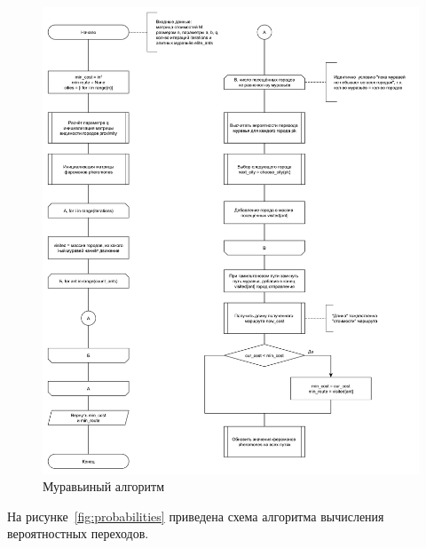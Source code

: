 \begin{figure}
	\centering
	\includegraphics[width=1.0\linewidth]{images/ant}
	\caption{Муравьиный алгоритм}
	\label{fig:ant}
\end{figure}

На рисунке~\ref{fig:probabilities} приведена схема алгоритма вычисления вероятностных переходов.

